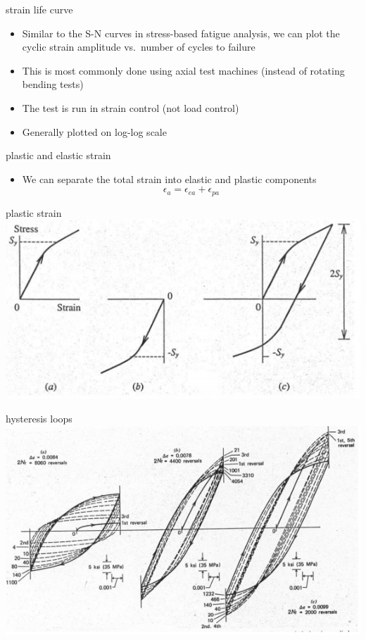 \documentclass[
  letterpaper,
  ignorenonframetext,
  aspectratio=43,
  handout,
  12pt]{beamer}
\providecommand{\tightlist}{%
  \setlength{\itemsep}{0pt}\setlength{\parskip}{0pt}}
\providecommand{\tightlist}{%
\setlength{\itemsep}{0pt}\setlength{\parskip}{0pt}}
\let\Oldincludegraphics\includegraphics
\renewcommand{\includegraphics}[2][]{\Oldincludegraphics[width=\textwidth,height=0.7\textheight,keepaspectratio]{#2}}
\begin{document}
\begin{frame}{strain life curve}
\protect\hypertarget{strain-life-curve}{}
\begin{itemize}
\tightlist
\item
  Similar to the S-N curves in stress-based fatigue analysis, we can
  plot the cyclic strain amplitude vs.~number of cycles to failure
\item
  This is most commonly done using axial test machines (instead of
  rotating bending tests)
\item
  The test is run in strain control (not load control)
\item
  Generally plotted on log-log scale
\end{itemize}
\end{frame}

\begin{frame}{plastic and elastic strain}
\protect\hypertarget{plastic-and-elastic-strain}{}
\begin{itemize}
\tightlist
\item
  We can separate the total strain into elastic and plastic components
  \[ \epsilon_a = \epsilon_{ea} + \epsilon_{pa}\]
\end{itemize}
\end{frame}

\begin{frame}{plastic strain}
\protect\hypertarget{plastic-strain}{}
\includegraphics{../images/plastic_strain.PNG}
\end{frame}

\begin{frame}{hysteresis loops}
\protect\hypertarget{hysteresis-loops}{}
\includegraphics{../images/hysteresis_loops.PNG}
\end{frame}
\end{document}
